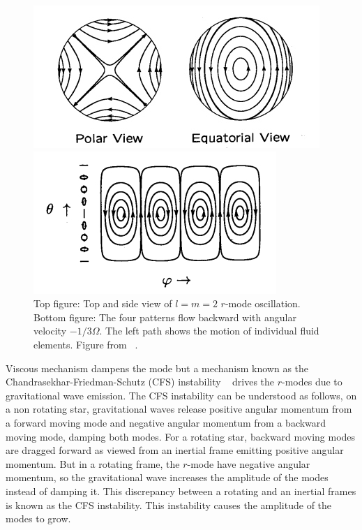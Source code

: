 \documentclass{ttuthes2007}
\begin{document}
\begin{figure}[h!]
  \centering
  \begin{minipage}[b]{0.5\textwidth}
    \includegraphics[width=\textwidth]{figure/rmodes.png}
  \end{minipage}
  \hfill
  \begin{minipage}[b]{0.5\textwidth}
    \includegraphics[width=\textwidth]{figure/rmodes1.png}
  \end{minipage}
\caption{Top figure: Top and side view of $l = m = 2$ $r$-mode oscillation.
Bottom figure: The four patterns flow backward with angular velocity $-1/3\Omega$. The
left path shows the motion of individual fluid elements. Figure from ~\cite{lindblom2001neutron}.}
\end{figure}
 Viscous mechanism dampens the mode but a mechanism known as the
Chandrasekhar-Friedman-Schutz (CFS) instability
~\cite{PhysRevLett.24.611}\cite{1978ApJ...222..281F} drives the $r$-modes due to
gravitational wave emission. The CFS instability can be understood as follows, on a non
rotating star, gravitational waves release positive angular momentum from
a forward moving mode and negative angular momentum from a backward moving mode,
damping both modes. For a rotating star, backward moving modes are dragged
forward as viewed from an inertial frame emitting positive angular momentum. But
in a rotating frame, the $r$-mode have negative angular momentum, so the gravitational
wave increases the amplitude of the modes instead of damping it. This discrepancy
between a rotating and an inertial frames is known as the CFS
instability. This instability causes the amplitude of the modes to
grow.~\cite{Owen_2000} 
\end{document}
